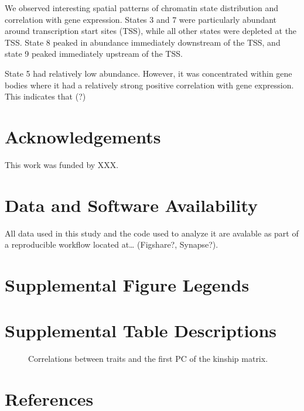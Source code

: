 \documentclass[10pt,letterpaper]{article}
\begin{document}
We observed interesting spatial patterns of chromatin state distribution
and correlation with gene expression. States 3 and 7 were particularly
abundant around transcription start sites (TSS), while all other states
were depleted at the TSS. State 8 peaked in abundance immediately
downstream of the TSS, and state 9 peaked immediately upstream of the
TSS.

State 5 had relatively low abundance. However, it was concentrated
within gene bodies where it had a relatively strong positive correlation
with gene expression. This indicates that (?)

\hypertarget{acknowledgements}{%
\section{Acknowledgements}\label{acknowledgements}}

This work was funded by XXX.

\hypertarget{data-and-software-availability}{%
\section{Data and Software
Availability}\label{data-and-software-availability}}

All data used in this study and the code used to analyze it are avalable
as part of a reproducible workflow located at\ldots{} (Figshare?,
Synapse?).

\hypertarget{supplemental-figure-legends}{%
\section{Supplemental Figure
Legends}\label{supplemental-figure-legends}}

\begin{figure}[ht]
\centering
\caption{
}
\label{fig:trait_cor}
\end{figure}

\hypertarget{supplemental-table-descriptions}{%
\section{Supplemental Table
Descriptions}\label{supplemental-table-descriptions}}

\begin{figure}[ht]
\centering
\caption{Correlations between traits and the first PC of the kinship matrix.
}
\label{table:trait_cor}
\end{figure}

\hypertarget{references}{%
\section*{References}\label{references}}

\nolinenumbers
\end{document}
